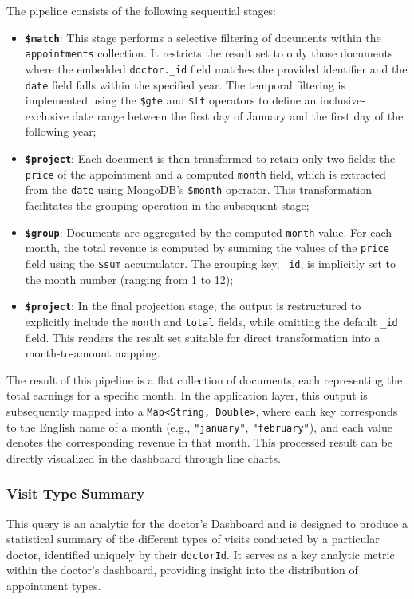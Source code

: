 The pipeline consists of the following sequential stages:

\begin{itemize}
	\item \textbf{\texttt{\$match}}: This stage performs a selective filtering of documents within the \texttt{appointments} collection. It restricts the result set to only those documents where the embedded \texttt{doctor.\_id} field matches the provided identifier and the \texttt{date} field falls within the specified year. The temporal filtering is implemented using the \texttt{\$gte} and \texttt{\$lt} operators to define an inclusive-exclusive date range between the first day of January and the first day of the following year;
	
	\item \textbf{\texttt{\$project}}: Each document is then transformed to retain only two fields: the \texttt{price} of the appointment and a computed \texttt{month} field, which is extracted from the \texttt{date} using MongoDB’s \texttt{\$month} operator. This transformation facilitates the grouping operation in the subsequent stage;
	
	\item \textbf{\texttt{\$group}}: Documents are aggregated by the computed \texttt{month} value. For each month, the total revenue is computed by summing the values of the \texttt{price} field using the \texttt{\$sum} accumulator. The grouping key, \texttt{\_id}, is implicitly set to the month number (ranging from 1 to 12);
	
	\item \textbf{\texttt{\$project}}: In the final projection stage, the output is restructured to explicitly include the \texttt{month} and \texttt{total} fields, while omitting the default \texttt{\_id} field. This renders the result set suitable for direct transformation into a month-to-amount mapping.
\end{itemize}

The result of this pipeline is a flat collection of documents, each representing the total earnings for a specific month. In the application layer, this output is subsequently mapped into a \texttt{Map<String, Double>}, where each key corresponds to the English name of a month (e.g., \texttt{"january"}, \texttt{"february"}), and each value denotes the corresponding revenue in that month. This processed result can be directly visualized in the dashboard through line charts.

\subsubsection{Visit Type Summary}
This query is an analytic for the doctor's Dashboard and is designed to produce a statistical summary of the different types of visits conducted by a particular doctor, identified uniquely by their \texttt{doctorId}. It serves as a key analytic metric within the doctor's dashboard, providing insight into the distribution of appointment types.


